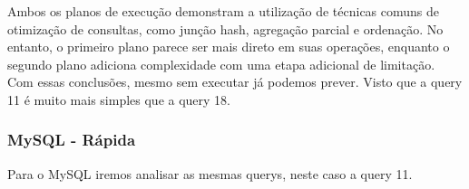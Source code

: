 \documentclass{article}
\begin{document}
Ambos os planos de execução demonstram a utilização de técnicas comuns de otimização de consultas, como junção hash, agregação parcial e ordenação. No entanto, o primeiro plano parece ser mais direto em suas operações, enquanto o segundo plano adiciona complexidade com uma etapa adicional de limitação.\\

Com essas conclusões, mesmo sem executar já podemos prever. Visto que a query 11 é muito mais simples que a query 18.



\subsubsection{MySQL - Rápida}
\texttt{}\par Para o MySQL iremos analisar as mesmas querys, neste caso a query 11.
\end{document}
